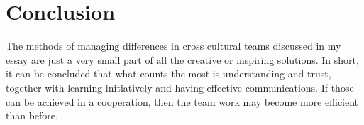 \documentclass{article}
\begin{document}
\section{Conclusion}
The methods of managing differences in cross cultural teams discussed in my essay are just a very small part of all the creative or inspiring solutions. In short, it can be concluded that what counts the most is understanding and trust, together with learning initiatively and having effective communications. If those can be achieved in a cooperation, then the team work may become more efficient than before.


  
\end{document}
